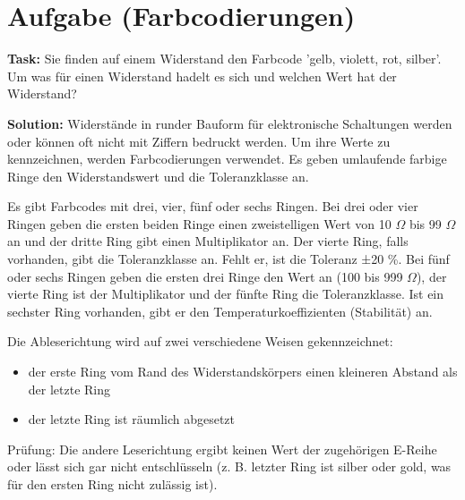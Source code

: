 \section{Aufgabe (Farbcodierungen)}%
\label{sec:aufgabe_1}

\textbf{Task:}
Sie finden auf einem Widerstand den Farbcode 'gelb, violett, rot, silber'. 
Um was für einen Widerstand hadelt es sich und welchen Wert hat der Widerstand?

\textbf{Solution:}
Widerstände in runder Bauform für elektronische Schaltungen werden 
oder können oft nicht mit Ziffern bedruckt werden. 
Um ihre Werte zu kennzeichnen, werden Farbcodierungen verwendet. 
Es geben umlaufende farbige Ringe den Widerstandswert und die Toleranzklasse 
an. 

Es gibt Farbcodes mit drei, vier, fünf oder sechs Ringen. Bei drei oder vier
Ringen geben die ersten beiden Ringe einen zweistelligen Wert von 10 $\Omega$ 
bis 99 $\Omega$ an und der dritte Ring gibt einen Multiplikator an.
Der vierte Ring, falls vorhanden, gibt die Toleranzklasse an. 
Fehlt er, ist die Toleranz ±20 \%.
Bei fünf oder sechs Ringen geben die ersten drei Ringe den Wert an (100 bis 999
$\Omega$), der vierte Ring ist der Multiplikator und der fünfte Ring die
Toleranzklasse. Ist ein sechster Ring vorhanden, gibt er den
Temperaturkoeffizienten (Stabilität) an.

Die Ableserichtung wird auf zwei verschiedene Weisen gekennzeichnet: 
\begin{itemize}
    \item der erste Ring vom Rand des Widerstandskörpers einen kleineren 
        Abstand als der letzte Ring
    \item der letzte Ring ist räumlich abgesetzt
\end{itemize}
Prüfung: 
Die andere Leserichtung ergibt keinen Wert der zugehörigen E-Reihe 
oder lässt sich gar nicht entschlüsseln (z. B. letzter Ring ist silber 
oder gold, was für den ersten Ring nicht zulässig ist). 

